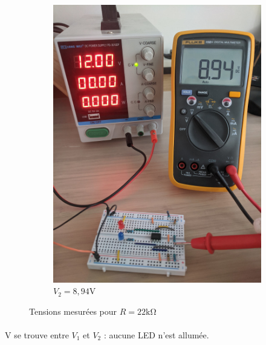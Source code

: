 \documentclass{article}
\begin{document}
\begin{figure}[H]
\begin{subfigure}{.3\textwidth}
        \includegraphics[width=\linewidth]{./images/labo4-22k-V2.jpg}  
        \caption{$V_2 = 8,94\si{\volt}$}
    \end{subfigure}
    \caption{Tensions mesurées pour $R = 22\si{\kilo\ohm}$}
\end{figure}
\paragraph{}
V se trouve entre $V_1$ et $V_2$ : aucune LED n'est allumée.

\newpage
\end{document}
